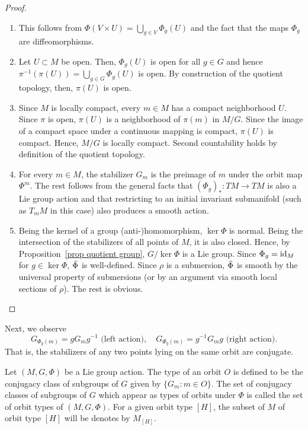 \begin{proof}
    \begin{enumerate}
        \item This follows from $\Phi(V\times U)=\bigcup_{g\in V}\Phi_g(U)$ and the fact that the maps $\Phi_g$ are diffeomorphisms.
        \item Let $U\subset M$ be open. Then, $\Phi_g(U)$ is open for all $g\in G$ and hence $\pi^{-1}(\pi(U))=\bigcup_{g\in G}\Phi_g(U)$ is open. By construction of the quotient topology, then, $\pi(U)$ is open.
        \item Since $M$ is locally compact, every $m\in M$ has a compact neighborhood $U$. Since $\pi$ is open, $\pi(U)$ is a neighborhood of $\pi(m)$ in $M\slash G$. Since the image of a compact space under a continuous mapping is compact, $\pi(U)$ is compact. Hence, $M\slash G$ is locally compact. Second countability holds by definition of the quotient topology.
        \item For every $m\in M$, the stabilizer $G_m$ is the preimage of $m$ under the orbit map $\Phi^m$. The rest follows from the general facts that $(\Phi_g)_{\ast}:TM\to TM$ is also a Lie group action and that restricting to an initial invariant submanifold (such as $T_mM$ in this case) also produces a smooth action.
        \item Being the kernel of a group (anti-)homomorphism, $\ker\Phi$ is normal. Being the intersection of the stabilizers of all points of $M$, it is also closed. Hence, by Proposition~\ref{prop quotient group}, $G\slash \ker\Phi$ is a Lie group. Since $\Phi_g=\operatorname{id}_M$ for $g\in\ker\Phi$, $\wh{\Phi}$ is well-defined. Since $\rho$ is a submersion, $\wh{\Phi}$ is smooth by the universal property of submersions (or by an argument via smooth local sections of $\rho$). The rest is obvious.
    \end{enumerate}
\end{proof}

Next, we observe
\[G_{\Phi_g(m)}=gG_mg^{-1}\text{ (left action)}, \quad G_{\Phi_g(m)}=g^{-1}G_mg\text{ (right action)}.\]
That is, the stabilizers of any two points lying on the same orbit are conjugate.


\begin{defn}
    Let $(M,G,\Phi)$ be a Lie group action. The type of an orbit $O$ is defined to be the conjugacy class of subgroups of $G$ given by $\{G_m:m\in O\}$. The set of conjugacy classes of subgroups of $G$ which appear as types of orbits under $\Phi$ is called the set of orbit types of $(M,G,\Phi)$. For a given orbit type $[H]$, the subset of $M$ of orbit type $[H]$ will be denotes by $M_{[H]}$.
\end{defn}

